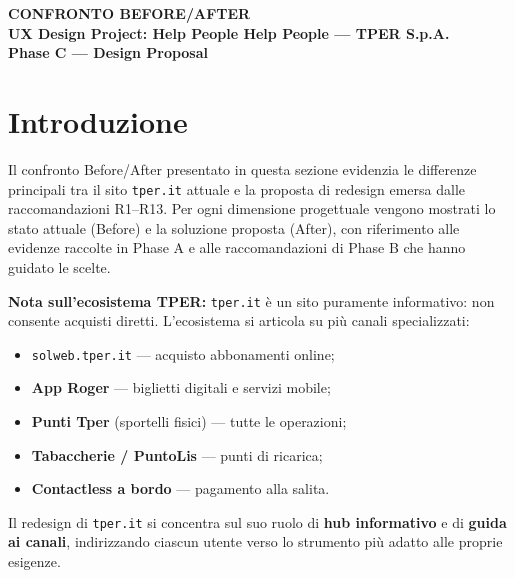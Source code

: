 \documentclass[11pt,a4paper]{article}
\begin{document}
\begin{tcolorbox}[colback=primaryColor,colframe=primaryColor,arc=3mm,halign=center,valign=center,height=2.5cm]
    \color{white}\LARGE\bfseries CONFRONTO BEFORE/AFTER \\[0.2cm]
    \color{white!80}\large UX Design Project: Help People Help People --- TPER S.p.A. \\[0.1cm]
    \color{white!60}\normalsize Phase C --- Design Proposal
\end{tcolorbox}

\vspace{0.5cm}

\section{Introduzione}

Il confronto Before/After presentato in questa sezione evidenzia le differenze principali tra il sito \texttt{tper.it} attuale e la proposta di redesign emersa dalle raccomandazioni R1--R13. Per ogni dimensione progettuale vengono mostrati lo stato attuale (Before) e la soluzione proposta (After), con riferimento alle evidenze raccolte in Phase A e alle raccomandazioni di Phase B che hanno guidato le scelte.

\vspace{0.3cm}

\textbf{Nota sull'ecosistema TPER:}
\texttt{tper.it} \`e un sito puramente informativo: non consente acquisti diretti. L'ecosistema si articola su pi\`u canali specializzati:
\begin{itemize}[nosep]
    \item \texttt{solweb.tper.it} --- acquisto abbonamenti online;
    \item \textbf{App Roger} --- biglietti digitali e servizi mobile;
    \item \textbf{Punti Tper} (sportelli fisici) --- tutte le operazioni;
    \item \textbf{Tabaccherie / PuntoLis} --- punti di ricarica;
    \item \textbf{Contactless a bordo} --- pagamento alla salita.
\end{itemize}
Il redesign di \texttt{tper.it} si concentra sul suo ruolo di \textbf{hub informativo} e di \textbf{guida ai canali}, indirizzando ciascun utente verso lo strumento pi\`u adatto alle proprie esigenze.

\vspace{0.3cm}

\end{document}
